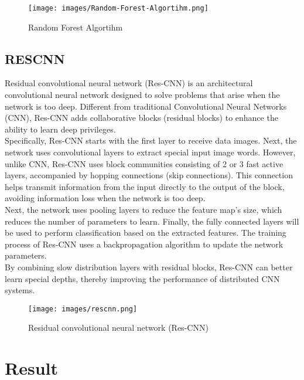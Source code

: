 \documentclass{ieeeojies}
\begin{document}
\begin{figure}[H]
    \centering
    \begin{minipage}{0.28\textwidth}
    \centering
   \texttt{[image: images/Random-Forest-Algortihm.png]}
    \caption{Random Forest Algortihm}
    \label{fig:1}
    \end{minipage}
\end{figure}

\subsection{RESCNN}
\indent Residual convolutional neural network (Res-CNN) is an architectural convolutional neural network designed to solve problems that arise when the network is too deep. Different from traditional Convolutional Neural Networks (CNN), Res-CNN adds collaborative blocks (residual blocks) to enhance the ability to learn deep privileges.
\\
\indent Specifically, Res-CNN starts with the first layer to receive data images. Next, the network uses convolutional layers to extract special input image words. However, unlike CNN, Res-CNN uses block communities consisting of 2 or 3 fast active layers, accompanied by hopping connections (skip connections). This connection helps transmit information from the input directly to the output of the block, avoiding information loss when the network is too deep.
\\
\indent Next, the network uses pooling layers to reduce the feature map's size, which reduces the number of parameters to learn. Finally, the fully connected layers will be used to perform classification based on the extracted features. The training process of Res-CNN uses a backpropagation algorithm to update the network parameters.
\\
\indent By combining slow distribution layers with residual blocks, Res-CNN can better learn special depths, thereby improving the performance of distributed CNN systems.

\begin{figure}[H]
    \centering
    \begin{minipage}{0.28\textwidth}
    \centering
   \texttt{[image: images/rescnn.png]}
    \caption{Residual convolutional neural network (Res-CNN)}
    \label{fig:1}
    \end{minipage}
\end{figure}

\section{Result}
\end{document}
